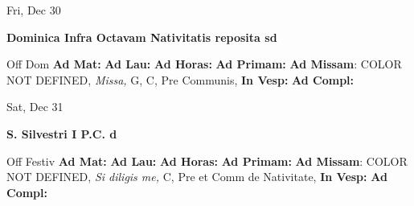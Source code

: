 \documentclass[10pt]{book}
\begin{document}
\begin{center}
\begin{minipage}{3.5in}
\vspace{2em}
\begin{center}Fri, Dec 30
\end{center}
\textbf{ \large Dominica Infra Octavam Nativitatis reposita
\textnormal{\normalsize sd}}

\begin{justify}Off Dom
\textbf{Ad Mat: }
\textbf{Ad Lau: }
\textbf{Ad Horas: }
\textbf{Ad Primam: }\textbf{Ad Missam}: COLOR NOT DEFINED, \textit{Missa,} G, C, Pre Communis, 
\textbf{In Vesp: }
\textbf{Ad Compl: }
\end{justify}
\end{minipage}
\end{center}

\begin{center}
\begin{minipage}{3.5in}
\vspace{2em}
\begin{center}Sat, Dec 31
\end{center}
\textbf{ \large S. Silvestri I P.C.
\textnormal{\normalsize d}}

\begin{justify}Off Festiv
\textbf{Ad Mat: }
\textbf{Ad Lau: }
\textbf{Ad Horas: }
\textbf{Ad Primam: }\textbf{Ad Missam}: COLOR NOT DEFINED, \textit{Si diligis me,} C, Pre et Comm de Nativitate, 
\textbf{In Vesp: }
\textbf{Ad Compl: }
\end{justify}
\end{minipage}
\end{center}
\end{document}
